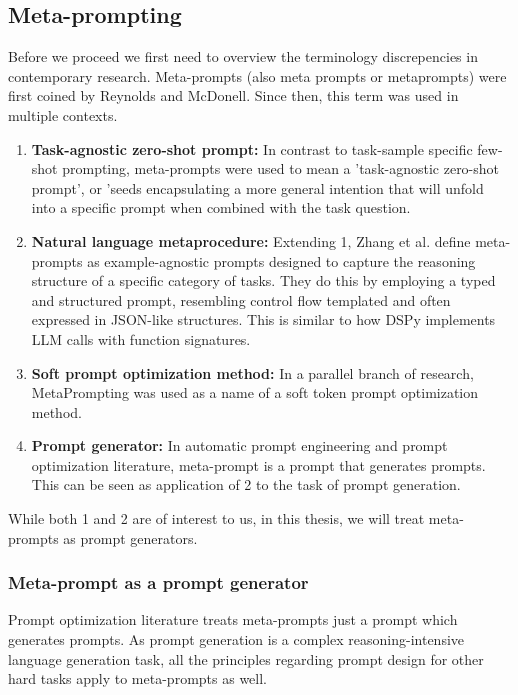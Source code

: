 \subsection{Meta-prompting}
Before we proceed we first need to overview the terminology discrepencies in contemporary research. 
Meta-prompts (also meta prompts or metaprompts) were first coined by Reynolds and McDonell\cite{reynolds2021promptprogramminglargelanguage}. 
Since then, this term was used in multiple contexts.
\begin{enumerate}
    \item \textbf{Task-agnostic zero-shot prompt:} In contrast to task-sample specific few-shot prompting, 
    meta-prompts were used to mean a 'task-agnostic zero-shot prompt', or 'seeds encapsulating a more general intention that will unfold into
    a specific prompt when combined with the task question\cite{reynolds2021promptprogramminglargelanguage}. 
    \item \textbf{Natural language metaprocedure:} Extending 1, Zhang et al.\cite{zhang2025metapromptingaisystems} define meta-prompts as example-agnostic prompts
    designed to capture the reasoning structure of a specific category of tasks. They do this by employing a typed and structured prompt, 
    resembling control flow templated and often expressed in JSON-like structures.
    This is similar to how DSPy\cite{khattab2023dspycompilingdeclarativelanguage} implements LLM calls with function signatures.
    \item \textbf{Soft prompt optimization method:} In a parallel branch of research, MetaPrompting\cite{hou2023metapromptinglearninglearnbetter} 
    was used as a name of a soft token prompt optimization method.
    \item \textbf{Prompt generator:} In automatic prompt engineering and prompt optimization literature, meta-prompt is a prompt that generates prompts\cite{dewynter2024metaprompting}.
    This can be seen as application of 2 to the task of prompt generation\cite{zhang2025metapromptingaisystems}.
\end{enumerate}

While both 1 and 2 are of interest to us, in this thesis, we will treat meta-prompts as prompt generators. 

\subsubsection{Meta-prompt as a prompt generator}
Prompt optimization literature\cite{ramnath2025systematicsurveyautomaticprompt} treats meta-prompts just a prompt which generates prompts.
As prompt generation is a complex reasoning-intensive language generation task\cite{ye2024promptengineeringpromptengineer}, 
all the principles regarding prompt design for other hard tasks apply to meta-prompts as well.

